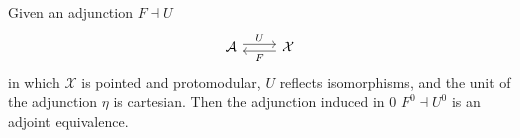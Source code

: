 \begin{mainbox}{}
\begin{prop}\label{ajoint equivalence for pullback functor}
Given an adjunction $F \dashv U$
\[
\begin{tikzcd}
\mathcal{A} \arrow[r, "U", shift left] & \mathcal{X} \arrow[l, "F", shift left]
\end{tikzcd}
\]
in which $\mathcal{X}$ is pointed and protomodular, $U$ reflects isomorphisms, and the unit of the adjunction $\eta$ is cartesian.
Then the adjunction induced in $0$ $F^0 \dashv U^0$ is an adjoint equivalence.
\end{prop}
\end{mainbox}

